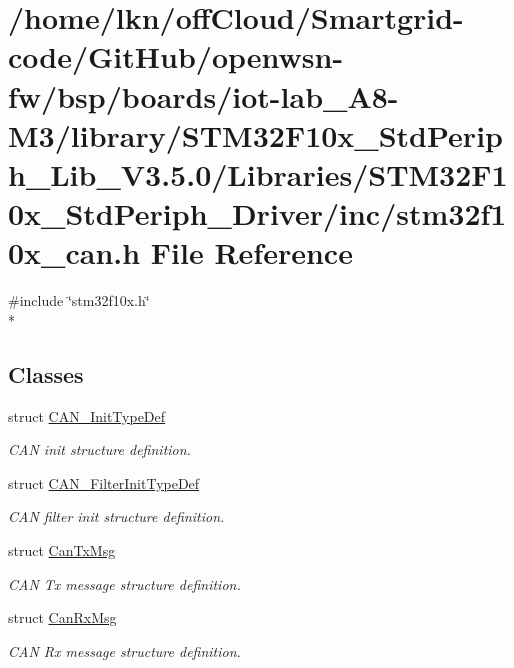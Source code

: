 \hypertarget{iot-lab___a8-_m3_2library_2_s_t_m32_f10x___std_periph___lib___v3_85_80_2_libraries_2_s_t_m32_f102ed2d9bda2becdf88cc3a74321a25bdf}{}\section{/home/lkn/off\+Cloud/\+Smartgrid-\/code/\+Git\+Hub/openwsn-\/fw/bsp/boards/iot-\/lab\+\_\+\+A8-\/\+M3/library/\+S\+T\+M32\+F10x\+\_\+\+Std\+Periph\+\_\+\+Lib\+\_\+\+V3.5.0/\+Libraries/\+S\+T\+M32\+F10x\+\_\+\+Std\+Periph\+\_\+\+Driver/inc/stm32f10x\+\_\+can.h File Reference}
\label{iot-lab___a8-_m3_2library_2_s_t_m32_f10x___std_periph___lib___v3_85_80_2_libraries_2_s_t_m32_f102ed2d9bda2becdf88cc3a74321a25bdf}
{\ttfamily \#include \char`\"{}stm32f10x.\+h\char`\"{}}\\*
\subsection*{Classes}
\begin{DoxyCompactItemize}
\item 
struct \hyperlink{struct_c_a_n___init_type_def}{C\+A\+N\+\_\+\+Init\+Type\+Def}
\begin{DoxyCompactList}\small\item\em C\+AN init structure definition. \end{DoxyCompactList}\item 
struct \hyperlink{struct_c_a_n___filter_init_type_def}{C\+A\+N\+\_\+\+Filter\+Init\+Type\+Def}
\begin{DoxyCompactList}\small\item\em C\+AN filter init structure definition. \end{DoxyCompactList}\item 
struct \hyperlink{struct_can_tx_msg}{Can\+Tx\+Msg}
\begin{DoxyCompactList}\small\item\em C\+AN Tx message structure definition. \end{DoxyCompactList}\item 
struct \hyperlink{struct_can_rx_msg}{Can\+Rx\+Msg}
\begin{DoxyCompactList}\small\item\em C\+AN Rx message structure definition. \end{DoxyCompactList}\end{DoxyCompactItemize}

